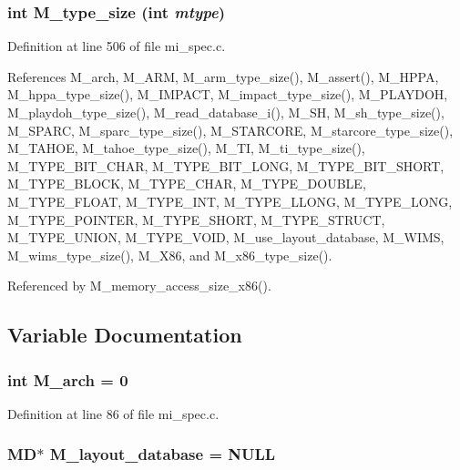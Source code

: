 \subsubsection{\setlength{\rightskip}{0pt plus 5cm}int M\_\-type\_\-size (int {\em mtype})}\label{mi__spec_8c_cad2efb034ba16e5120a93383b5d8592}




Definition at line 506 of file mi\_\-spec.c.

References M\_\-arch, M\_\-ARM, M\_\-arm\_\-type\_\-size(), M\_\-assert(), M\_\-HPPA, M\_\-hppa\_\-type\_\-size(), M\_\-IMPACT, M\_\-impact\_\-type\_\-size(), M\_\-PLAYDOH, M\_\-playdoh\_\-type\_\-size(), M\_\-read\_\-database\_\-i(), M\_\-SH, M\_\-sh\_\-type\_\-size(), M\_\-SPARC, M\_\-sparc\_\-type\_\-size(), M\_\-STARCORE, M\_\-starcore\_\-type\_\-size(), M\_\-TAHOE, M\_\-tahoe\_\-type\_\-size(), M\_\-TI, M\_\-ti\_\-type\_\-size(), M\_\-TYPE\_\-BIT\_\-CHAR, M\_\-TYPE\_\-BIT\_\-LONG, M\_\-TYPE\_\-BIT\_\-SHORT, M\_\-TYPE\_\-BLOCK, M\_\-TYPE\_\-CHAR, M\_\-TYPE\_\-DOUBLE, M\_\-TYPE\_\-FLOAT, M\_\-TYPE\_\-INT, M\_\-TYPE\_\-LLONG, M\_\-TYPE\_\-LONG, M\_\-TYPE\_\-POINTER, M\_\-TYPE\_\-SHORT, M\_\-TYPE\_\-STRUCT, M\_\-TYPE\_\-UNION, M\_\-TYPE\_\-VOID, M\_\-use\_\-layout\_\-database, M\_\-WIMS, M\_\-wims\_\-type\_\-size(), M\_\-X86, and M\_\-x86\_\-type\_\-size().

Referenced by M\_\-memory\_\-access\_\-size\_\-x86().

\subsection{Variable Documentation}
\subsubsection{\setlength{\rightskip}{0pt plus 5cm}int \bf{M\_\-arch} = 0}\label{mi__spec_8c_459f82172b68fe91c09e0c89d4d55cfa}




Definition at line 86 of file mi\_\-spec.c.
\subsubsection{\setlength{\rightskip}{0pt plus 5cm}\bf{MD}$\ast$ \bf{M\_\-layout\_\-database} = \bf{NULL}\hspace{0.3cm}{\tt  [static]}}\label{mi__spec_8c_e6f030e4a528981891fb5022b85fb4ed}




